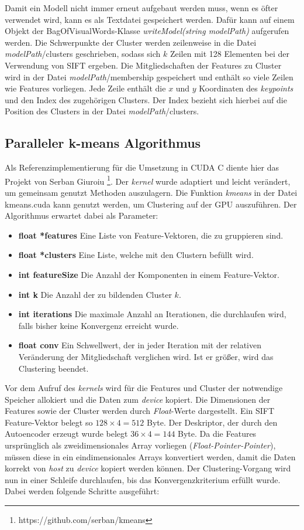  Damit ein Modell nicht immer erneut aufgebaut werden muss, wenn es öfter verwendet wird, kann es als Textdatei gespeichert werden. Dafür kann auf einem Objekt der BagOfVisualWords-Klasse \textit{writeModel(string modelPath)} aufgerufen werden. Die Schwerpunkte der Cluster werden zeilenweise in die Datei \textit{modelPath}/clusters geschrieben, sodass sich $k$ Zeilen mit 128 Elementen bei der Verwendung von SIFT ergeben. Die Mitgliedschaften der Features zu Cluster wird in der Datei \textit{modelPath}/membership gespeichert und enthält so viele Zeilen wie Features vorliegen. Jede Zeile enthält die $x$ und $y$ Koordinaten des \textit{keypoints} und den Index des zugehörigen Clusters. Der Index bezieht sich hierbei auf die Position des Clusters in der Datei \textit{modelPath}/clusters.

\subsection{Paralleler k-means Algorithmus}

Als Referenzimplementierung für die Umsetzung in CUDA C diente hier das Projekt von Serban Giuroiu \footnote{https://github.com/serban/kmeans}. Der \textit{kernel} wurde adaptiert und leicht verändert, um gemeinsam genutzt Methoden auszulagern. Die Funktion \textit{kmeans} in der Datei kmeans.cuda kann genutzt werden, um Clustering auf der GPU auszuführen. Der Algorithmus erwartet dabei als Parameter:

\begin{itemize}
	\item \textbf{float *features} Eine Liste von Feature-Vektoren, die zu gruppieren sind.	
	\item \textbf{float *clusters} Eine Liste, welche mit den Clustern befüllt wird.
	\item \textbf{int featureSize} Die Anzahl der Komponenten in einem Feature-Vektor.
	\item \textbf{int k} Die Anzahl der zu bildenden Cluster $k$.
	\item \textbf{int iterations} Die maximale Anzahl an Iterationen, die durchlaufen wird, falls bisher keine Konvergenz erreicht wurde.
	\item \textbf{float conv} Ein Schwellwert, der in jeder Iteration mit der relativen Veränderung der Mitgliedschaft verglichen wird. Ist er größer, wird das Clustering beendet.
\end{itemize}

Vor dem Aufruf des \textit{kernels} wird für die Features und Cluster der notwendige Speicher allokiert und die Daten zum \textit{device} kopiert. Die Dimensionen der Features sowie der Cluster werden durch \textit{Float}-Werte dargestellt. Ein SIFT Feature-Vektor belegt so $128 \times 4 = 512$ Byte. Der Deskriptor, der durch den Autoencoder erzeugt wurde belegt $36 \times 4 = 144$ Byte. Da die Features ursprünglich als zweidimensionales Array vorliegen (\textit{Float-Pointer-Pointer}), müssen diese in ein eindimensionales Arrays konvertiert werden, damit die Daten korrekt von \textit{host} zu \textit{device} kopiert werden können. 
Der Clustering-Vorgang wird nun in einer Schleife durchlaufen, bis das Konvergenzkriterium erfüllt wurde. Dabei werden folgende Schritte ausgeführt:

